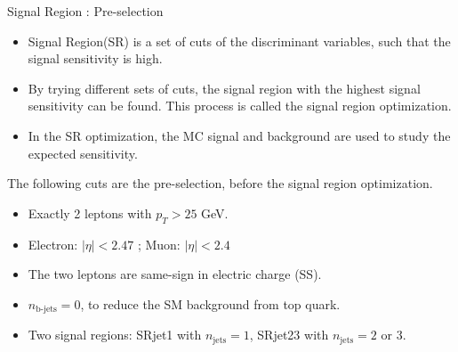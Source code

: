 \documentclass[mathserif,serif]{beamer}
\begin{document}
\begin{frame}{Signal Region : Pre-selection}
\begin{itemize}
\item Signal Region(SR) is a set of cuts of the discriminant variables, such that the signal sensitivity is high.
\item By trying different sets of cuts, the signal region with the highest signal sensitivity can be found. This process is called the signal region optimization.
\item In the SR optimization, the MC signal and background are used to study the expected sensitivity.
\end{itemize}
The following cuts are the pre-selection, before the signal region optimization.
\begin{itemize}
\item Exactly 2 leptons with $p_T > 25$ GeV.
\item Electron: $|\eta| < 2.47$ ; Muon: $|\eta| < 2.4$
\item The two leptons are same-sign in electric charge (SS).
\item $n_{\text{b-jets}} = 0$, to reduce the SM background from top quark.
\item Two signal regions: SRjet1 with $n_{\text{jets}} = 1$, SRjet23 with $n_{\text{jets}} = 2$ or $3$.
\end{itemize}
\end{frame}
\end{document}
